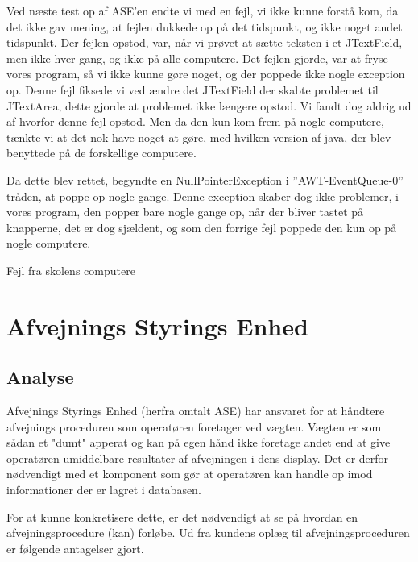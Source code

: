 \documentclass[a4paper]{article}
\begin{document}
Ved næste test op af ASE’en endte vi med en fejl, vi ikke kunne forstå kom, da det ikke gav mening, at fejlen dukkede op på det tidspunkt, og ikke noget andet tidspunkt. Der fejlen opstod, var, når vi prøvet at sætte teksten i et JTextField, men ikke hver gang, og ikke på alle computere. Det fejlen gjorde, var at fryse vores program, så vi ikke kunne gøre noget, og der poppede ikke nogle exception op. Denne fejl fiksede vi ved ændre det JTextField der skabte problemet til JTextArea, dette gjorde at problemet ikke længere opstod. Vi fandt dog aldrig ud af hvorfor denne fejl opstod. Men da den kun kom frem på nogle computere, tænkte vi at det nok have noget at gøre, med hvilken version af java, der blev benyttede på de forskellige computere.

Da dette blev rettet, begyndte en NullPointerException i ”AWT-EventQueue-0” tråden, at poppe op nogle gange. Denne exception skaber dog ikke problemer, i vores program, den popper bare nogle gange op, når der bliver tastet på knapperne, det er dog sjældent, og som den forrige fejl poppede den kun op på nogle computere.

\begin{center}
  Fejl fra skolens computere 
\end{center}




\section{Afvejnings Styrings Enhed} %

\subsection{Analyse} %

Afvejnings Styrings Enhed (herfra omtalt ASE) har ansvaret for at håndtere afvejnings proceduren som operatøren foretager ved vægten. Vægten er som sådan et "dumt" apperat og kan på egen hånd ikke foretage andet end at give operatøren umiddelbare resultater af afvejningen i dens display. Det er derfor nødvendigt med et komponent som gør at operatøren kan handle op imod informationer der er lagret i databasen.

For at kunne konkretisere dette, er det nødvendigt at se på hvordan en afvejningsprocedure (kan) forløbe. Ud fra kundens oplæg til afvejningsproceduren er følgende antagelser gjort.
\end{document}
